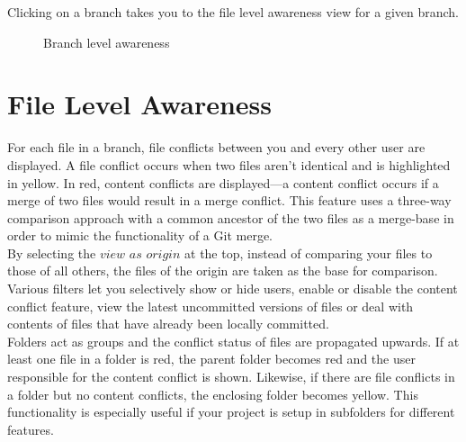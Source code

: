 Clicking on a branch takes you to the file level awareness view for a given branch.



\begin{figure}[h!]
  \centering
  \caption{Branch level awareness}
  \label{fig:branchlevel}
\end{figure}





\section{File Level Awareness}

For each file in a branch, file conflicts between you and every other user are displayed. A file conflict occurs when two files aren't identical and is highlighted in yellow. In red, content conflicts are displayed---a content conflict occurs if a merge of two files would result in a merge conflict. This feature uses a three-way comparison approach with a common ancestor of the two files as a merge-base in order to mimic the functionality of a Git merge. \\

By selecting the $view$ $as$ $origin$ at the top, instead of comparing your files to those of all others, the files of the origin are taken as the base for comparison. Various filters let you selectively show or hide users, enable or disable the content conflict feature, view the latest uncommitted versions of files or deal with contents of files that have already been locally committed. \\

Folders act as groups and the conflict status of files are propagated upwards. If at least one file in a folder is red, the parent folder becomes red and the user responsible for the content conflict is shown. Likewise, if there are file conflicts in a folder but no content conflicts, the enclosing folder becomes yellow. This functionality is especially useful if your project is setup in subfolders for different features. \\

